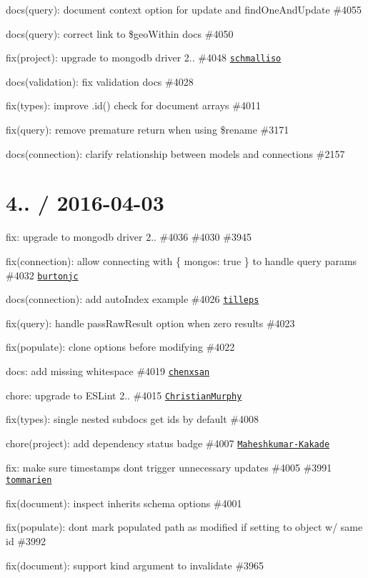 \begin{DoxyItemize}
\item docs(query)\+: document context option for update and find\+One\+And\+Update \#4055
\item docs(query)\+: correct link to \$geo\+Within docs \#4050
\item fix(project)\+: upgrade to mongodb driver 2.. \#4048 \href{https://github.com/schmalliso}{\tt schmalliso}
\item docs(validation)\+: fix validation docs \#4028
\item fix(types)\+: improve .id() check for document arrays \#4011
\item fix(query)\+: remove premature return when using \$rename \#3171
\item docs(connection)\+: clarify relationship between models and connections \#2157
\end{DoxyItemize}

\section*{4.. / 2016-\/04-\/03 }


\begin{DoxyItemize}
\item fix\+: upgrade to mongodb driver 2.. \#4036 \#4030 \#3945
\item fix(connection)\+: allow connecting with \{ mongos\+: true \} to handle query params \#4032 \href{https://github.com/burtonjc}{\tt burtonjc}
\item docs(connection)\+: add auto\+Index example \#4026 \href{https://github.com/tilleps}{\tt tilleps}
\item fix(query)\+: handle pass\+Raw\+Result option when zero results \#4023
\item fix(populate)\+: clone options before modifying \#4022
\item docs\+: add missing whitespace \#4019 \href{https://github.com/chenxsan}{\tt chenxsan}
\item chore\+: upgrade to E\+S\+Lint 2.. \#4015 \href{https://github.com/ChristianMurphy}{\tt Christian\+Murphy}
\item fix(types)\+: single nested subdocs get ids by default \#4008
\item chore(project)\+: add dependency status badge \#4007 \href{http://github.com/Maheshkumar-Kakade}{\tt Maheshkumar-\/\+Kakade}
\item fix\+: make sure timestamps don\textquotesingle{}t trigger unnecessary updates \#4005 \#3991 \href{https://github.com/tommarien}{\tt tommarien}
\item fix(document)\+: inspect inherits schema options \#4001
\item fix(populate)\+: don\textquotesingle{}t mark populated path as modified if setting to object w/ same id \#3992
\item fix(document)\+: support kind argument to invalidate \#3965
\end{DoxyItemize}

